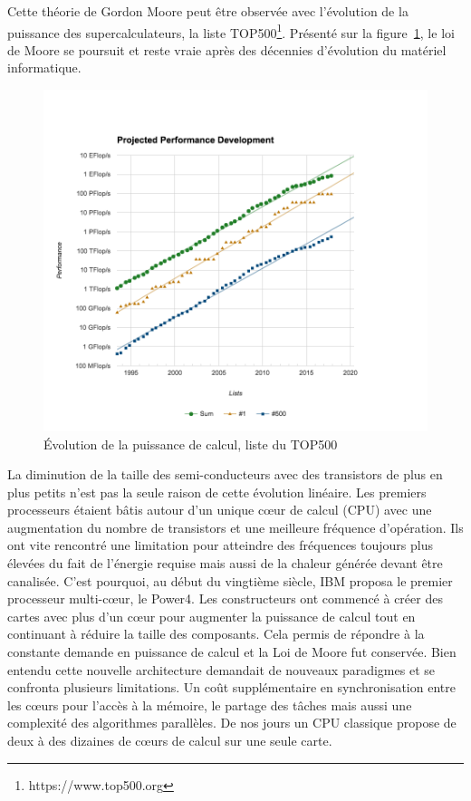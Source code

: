 \documentclass[12pt,a4paper]{report}
\begin{document}
Cette théorie de Gordon Moore peut être observée avec l'évolution de la puissance des supercalculateurs, la liste TOP500\footnote{https://www.top500.org}.
Présenté sur la figure~\ref{fig:intro_top500}, le loi de Moore se poursuit et reste vraie après des décennies d'évolution du matériel informatique.

\begin{figure}[h]
\centering
\includegraphics[width=.7\linewidth]{../figures/introduction/top500_list_approximation.png}
\caption{\'Evolution de la puissance de calcul, liste du TOP500}
\label{fig:intro_top500}
\end{figure}

La diminution de la taille des semi-conducteurs avec des transistors de plus en plus petits n'est pas la seule raison de cette évolution linéaire. 
Les premiers processeurs étaient bâtis autour d'un unique cœur de calcul (CPU) avec une augmentation du nombre de transistors et une meilleure fréquence d'opération.
Ils ont vite rencontré une limitation pour atteindre des fréquences toujours plus élevées du fait de l'énergie requise mais aussi de la chaleur générée devant être canalisée.
C'est pourquoi, au début du vingtième siècle, IBM proposa le premier processeur multi-cœur, le Power4.
Les constructeurs ont commencé à créer des cartes avec plus d’un cœur pour augmenter la puissance de calcul tout en continuant à réduire la taille des composants. 
Cela permis de répondre à la constante demande en puissance de calcul et la Loi de Moore fut conservée. 
Bien entendu cette nouvelle architecture demandait de nouveaux paradigmes et se confronta plusieurs limitations. 
Un coût supplémentaire en synchronisation entre les cœurs pour l'accès à la mémoire, le partage des tâches mais aussi une complexité des algorithmes parallèles. 
De nos jours un CPU classique propose de deux à des dizaines de cœurs de calcul sur une seule carte.\\
\end{document}
